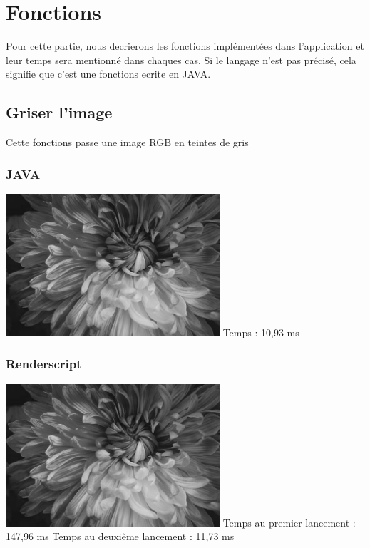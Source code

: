 \documentclass{article}
\begin{document}
\section{Fonctions}

Pour cette partie, nous decrierons les fonctions implémentées dans l'application et leur temps sera mentionné dans chaques cas. Si le langage n'est pas précisé, cela signifie que c'est une fonctions ecrite en JAVA.

\subsection{Griser l'image}
\medbreak

Cette fonctions passe une image RGB en teintes de gris
\medbreak

\subsubsection{JAVA}
\medbreak

\begin{center}
    \medbreak
    \includegraphics[width=300px]{./Images/Multicolor/Gray.jpg}
    \bigbreak
    Temps : 10,93 ms
\end{center}

\bigbreak
\subsubsection{Renderscript}
\medbreak

\begin{center}
    \medbreak
    \includegraphics[width=300px]{./Images/Multicolor/Gray_RS.jpg}
    \bigbreak
    Temps au premier lancement : 147,96 ms
    \medbreak
    Temps au deuxième lancement : 11,73 ms
\end{center}
\end{document}
